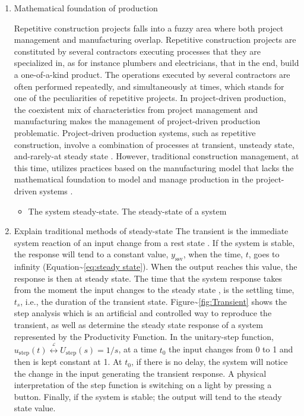 \documentclass{article}
\begin{document}
\begin{enumerate}
\item Mathematical foundation of production
\label{sec:org959bc8d}

Repetitive construction projects falls into a fuzzy area where both project management and manufacturing overlap.
Repetitive construction projects are constituted by several contractors executing processes that they are specialized in, as for instance plumbers and electricians, that in the end, build a one-of-a-kind product.
The operations executed by several contractors are often performed repeatedly, and simultaneously at times, which stands for one of the peculiarities of repetitive projects.
In project-driven production, the coexistent mix of characteristics from project management and manufacturing makes the management of project-driven production problematic.
Project-driven production systems, such as repetitive construction, involve a combination of processes at transient, unsteady state, and-rarely-at steady state \citep{Antunes2015a,Antunes2015,Bashford2005,Walsh2007}.
However, traditional construction management, at this time, utilizes practices based on the manufacturing model that lacks the mathematical foundation to model and manage production in the project-driven systems \citep{Bertelsen2003,McCray2002,Pereira2013,Ko2016}.

\begin{itemize}
\item The system steady-state.
The steady-state of a system
\end{itemize}

\item Explain traditional methods of steady-state
\label{sec:org0ea4626}
The transient is the immediate system reaction of an input change from a rest state \citep{Ogata2010}.
If the system is stable, the response will tend to a constant value, \(y_{\mbox{ssv}}\), when the time, \(t\), goes to infinity (Equation\textasciitilde{}\ref{eq:steady state}).
When the output reaches this value, the response is then at steady state.
The time that the system response takes from the moment the input changes to the steady state \citep{Nise2010,Ogata2010}, is the settling time, \(t_s\), i.e., the duration of the transient state.
Figure\textasciitilde{}\ref{fig:Transient} shows the step analysis which is an artificial and controlled way to reproduce the transient, as well as determine the steady state response of a system represented by the Productivity Function.
In the unitary-step function, \(u_{\mbox{step}}(t) \overset{\underset{\mathrm{\mathcal{L}}}{}}{\leftrightarrow} U_{\mbox{step}}(s) = 1/s\), at a time \(t_0\) the input changes from 0 to 1 and then is kept constant at 1.
At \(t_0\), if there is no delay, the system will notice the change in the input generating the transient response.
A physical interpretation of the step function is switching on a light by pressing a button.
Finally, if the system is stable; the output will tend to the steady state value.


\end{enumerate}
\end{document}
